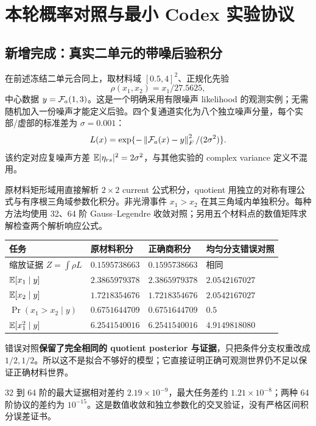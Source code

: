 \section{本轮概率对照与最小 Codex 实验协议}

\subsection{新增完成：真实二单元的带噪后验积分}

在前述冻结二单元合同上，取材料域 $[0.5,4]^2$、正规化先验
\begin{equation}
\rho(x_1,x_2)=x_1/27.5625,
\end{equation}
中心数据 $y={\mathcal F_a}(1,3)$。这是一个明确采用有限噪声 likelihood 的观测实例；无需随机加入一份噪声才能定义后验。四个复通道实化为八个独立噪声分量，每个实部/虚部的标准差为 $\sigma=0.001$：
\begin{equation}
L(x)=\exp\{-\left\lVert {\mathcal F_a}(x)-y\right\rVert_F^2/(2\sigma^2)\}.
\end{equation}
该约定对应复噪声方差 $\mathbb E|\eta_{rs}|^2=2\sigma^2$，与其他实验的 complex variance 定义不混用。

原材料矩形域用直接解析 $2\times2$ current 公式积分，quotient 用独立的对称有理公式与有序根三角域参数化积分。非光滑事件 $x_1>x_2$ 在其三角域内单独积分。每种方法均使用 32、64 阶 Gauss--Legendre 收敛对照；另用五个材料点的数值矩阵求解检查两个解析响应公式。

\begin{longtable}{@{}p{}p{}p{}p{}@{}}
\toprule 任务 & 原材料积分 & 正确商积分 & 均匀分支错误对照\\\midrule\endhead
缩放证据 $Z=\int\rho L$ & $0.1595738663$ & $0.1595738663$ & 相同\\
$\mathbb E[x_1\mid y]$ & $2.3865979378$ & $2.3865979378$ & $2.0542167027$\\
$\mathbb E[x_2\mid y]$ & $1.7218354676$ & $1.7218354676$ & $2.0542167027$\\
$\Pr(x_1>x_2\mid y)$ & $0.6751644709$ & $0.6751644709$ & $0.5$\\
$\mathbb E[x_1^2\mid y]$ & $6.2541540016$ & $6.2541540016$ & $4.9149818080$\\\bottomrule
\end{longtable}

错误对照\textbf{保留了完全相同的 quotient posterior 与证据}，只把条件分支权重改成 $1/2,1/2$。所以这不是拟合不够好的模型；它直接证明正确可观测世界仍不足以保证正确材料世界。

32 到 64 阶的最大证据相对差约 $2.19\times10^{-9}$，最大任务差约 $1.21\times10^{-8}$；两种 64 阶协议的差约为 $10^{-15}$。这是数值收敛和独立参数化的交叉验证，没有严格区间积分误差证书。

